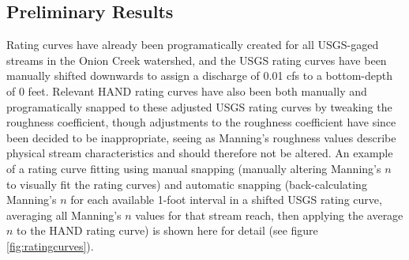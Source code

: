 \documentclass[11pt]{article}
\begin{document}
  \subsection*{Preliminary Results} %

  Rating curves have already been programatically created for all USGS-gaged streams in the Onion Creek watershed, and the USGS rating curves have been manually shifted downwards to assign a discharge of 0.01 cfs to a bottom-depth of 0 feet. Relevant HAND rating curves have also been both manually and programatically snapped to these adjusted USGS rating curves by tweaking the roughness coefficient, though adjustments to the roughness coefficient have since been decided to be inappropriate, seeing as Manning's roughness values describe physical stream characteristics and should therefore not be altered. An example of a rating curve fitting using manual snapping (manually altering Manning's $n$ to visually fit the rating curves) and automatic snapping (back-calculating Manning's $n$ for each available 1-foot interval in a shifted USGS rating curve, averaging all Manning's $n$ values for that stream reach, then applying the average $n$ to the HAND rating curve) is shown here for detail (see figure \ref{fig:ratingcurves}). 
\end{document}
